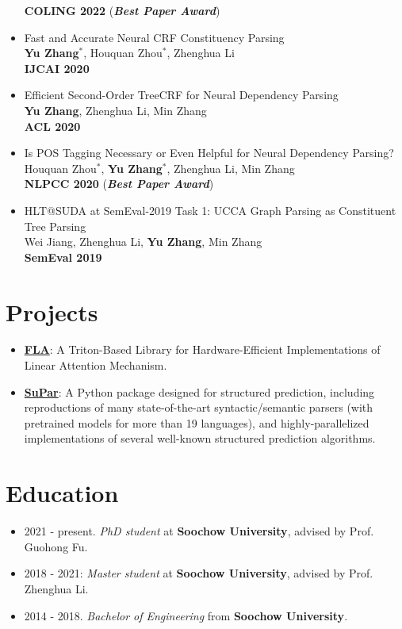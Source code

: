\documentclass[a4paper,12pt]{article}
\begin{document}
\begin{itemize}[leftmargin=18pt]
            \textbf{COLING 2022} (\textbf{\emph{\textcolor{brickred}{Best Paper Award}}})
      \item Fast and Accurate Neural CRF Constituency Parsing\\
            \textbf{Yu Zhang$^*$}, Houquan Zhou$^*$, Zhenghua Li\\
            \textbf{IJCAI 2020}
      \item Efficient Second-Order TreeCRF for Neural Dependency Parsing\\
            \textbf{Yu Zhang}, Zhenghua Li, Min Zhang\\
            \textbf{ACL 2020}
      \item Is POS Tagging Necessary or Even Helpful for Neural Dependency Parsing?\\
            Houquan Zhou$^*$, \textbf{Yu Zhang$^*$}, Zhenghua Li, Min Zhang\\
            \textbf{NLPCC 2020} (\textbf{\emph{\textcolor{brickred}{Best Paper Award}}})
      \item HLT@SUDA at SemEval-2019 Task 1: UCCA Graph Parsing as Constituent Tree Parsing\\
            Wei Jiang, Zhenghua Li, \textbf{Yu Zhang}, Min Zhang\\
            \textbf{SemEval 2019}
\end{itemize}

\section{Projects}
\begin{itemize}[leftmargin=18pt]
      \item \href{https://github.com/sustcsonglin/flash-linear-attention}{\textbf{FLA}}: A Triton-Based Library for Hardware-Efficient Implementations of Linear Attention Mechanism.
      \item \href{https://github.com/yzhangcs/parser}{\textbf{SuPar}}: A Python package designed for structured prediction, including reproductions of many state-of-the-art syntactic/semantic parsers (with pretrained models for more than 19 languages), and highly-parallelized implementations of several well-known structured prediction algorithms.
\end{itemize}

\section{Education}
\begin{itemize}[leftmargin=18pt]
      \item 2021 - present. \emph{PhD student} at \textbf{Soochow University}, advised by Prof. Guohong Fu.
      \item 2018 - 2021: \emph{Master student} at \textbf{Soochow University}, advised by Prof. Zhenghua Li.
      \item 2014 - 2018. \emph{Bachelor of Engineering} from \textbf{Soochow University}.
\end{itemize}
\end{document}
